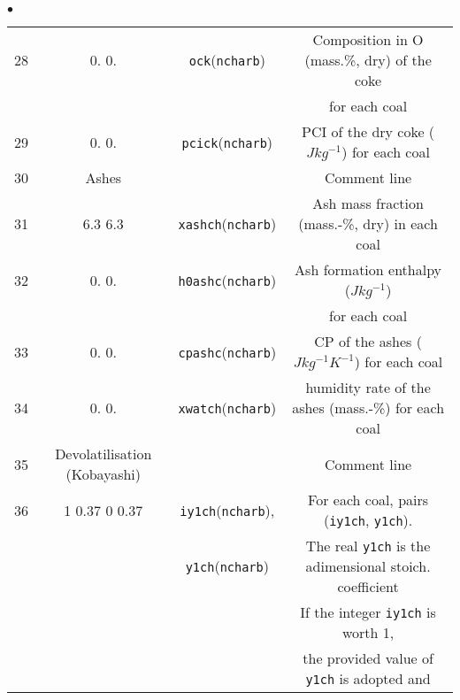 {{{\begin{list}{$\bullet$}{}
\begin{table}[htbp]
\begin{center}
{\begin{tabular}{|c|c|c|c|}
  28    &      0.         0.             & \texttt{ock\index{ock}}(\texttt{ncharb}) & Composition in O (mass.\%, dry) of the coke          \\
        &                                &                               & for each coal                                        \\ \hline
  29    &      0.         0.             & \texttt{pcick\index{pcick}}(\texttt{ncharb})& PCI of the dry coke ($Jkg^{-1}$) for each coal       \\ \hline
  30    &          Ashes               &                               & Comment line                                         \\ \hline
  31    &      6.3        6.3            & \texttt{xashch\index{xashch}}(\texttt{ncharb})& Ash mass fraction (mass.-\%, dry) in each coal       \\ \hline
  32    &      0.         0.             & \texttt{h0ashc\index{h0ashc}}(\texttt{ncharb})  & Ash formation enthalpy ($Jkg^{-1}$)                  \\
        &                                &                               & for each coal                                        \\ \hline
  33    &      0.         0.             & \texttt{cpashc\index{cpashc}}(\texttt{ncharb})   & CP of the ashes ($Jkg^{-1}K^{-1}$) for each coal     \\ \hline
  34    &      0.         0.             & \texttt{xwatch\index{cpashc}}(\texttt{ncharb})   & humidity rate of the ashes (mass.-\%) for each coal     \\ \hline
  35    &  Devolatilisation (Kobayashi)  &                             & Comment line                                         \\ \hline
  36    &  1  0.37      0  0.37          & \texttt{iy1ch\index{iy1ch}}(\texttt{ncharb}),   & For each coal, pairs (\texttt{iy1ch}, \texttt{y1ch}).                  \\
        &                                & \texttt{y1ch\index{y1ch}}(\texttt{ncharb})     & The real \texttt{y1ch} is the adimensional stoich. coefficient\\
        &                                &                               & If the integer \texttt{iy1ch} is worth 1,                     \\
        &                                &                               & the provided value of \texttt{y1ch} is adopted and            \\

\end{tabular}}
\end{center}
\end{table}
\end{list}}}}
